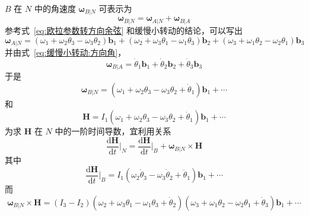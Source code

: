 \begin{example}
    $B$ 在 $N$ 中的角速度 $\bm{\omega}_{B|N}$ 可表示为
    \begin{equation}
        \bm{\omega}_{B|N} = \bm{\omega}_{A|N} + \bm{\omega}_{B|A}
        \label{eq:缓慢小转动:角速度合成}
    \end{equation}
    参考式~\eqref{eq:欧拉参数转方向余弦} 和缓慢小转动的结论，可以写出
    \begin{equation}
        \bm{\omega}_{A|N} = (\omega_1+\omega_2\theta_3-\omega_3\theta_2)\mathbf{b}_1
        + (\omega_2+\omega_3\theta_1-\omega_1\theta_3)\mathbf{b}_2
        + (\omega_3+\omega_1\theta_2-\omega_2\theta_1)\mathbf{b}_3
        \label{eq:缓慢小转动:omegaA_N}
    \end{equation}
    并由式~\eqref{eq:缓慢小转动:方向角}，
    \begin{equation}
        \bm{\omega}_{B|A} = \dot{\theta}_1\mathbf{b}_1+\dot{\theta}_2\mathbf{b}_2+\dot{\theta}_3\mathbf{b}_3
        \label{eq:缓慢小转动:omegaB_A}
    \end{equation}
    于是
    \begin{equation}
        \bm{\omega}_{B|N} = (\omega_1+\omega_2\theta_3-\omega_3\theta_2+\dot{\theta}_1)\mathbf{b}_1+\cdots
        \label{eq:缓慢小转动:omegaB_N}
    \end{equation}
    和
    \begin{equation}
        \mathbf{H} = I_1(\omega_1+\omega_2\theta_3-\omega_3\theta_2+\dot{\theta}_1)\mathbf{b}_1+\cdots
        \label{eq:缓慢小转动:角动量}
    \end{equation}
    为求 $\mathbf{H}$ 在 $N$ 中的一阶时间导数，宜利用关系
    \begin{equation}
        \frac{\mathrm{d}\mathbf{H}}{\mathrm{d}t}\Big|_{N} = \frac{\mathrm{d}\mathbf{H}}{\mathrm{d}t}\Big|_{B} + \bm{\omega}_{B|N}\times\mathbf{H}
        \label{eq:缓慢小转动:H导数}
    \end{equation}
    其中
    \begin{equation}
        \frac{\mathrm{d}\mathbf{H}}{\mathrm{d}t}\Big|_{B} = I_1(\omega_2\dot{\theta}_3-\omega_3\dot{\theta}_2+\ddot{\theta}_1)\mathbf{b}_1+\cdots
        \label{eq:缓慢小转动:B系H导数}
    \end{equation}
    而
    \begin{equation}
        \bm{\omega}_{B|N}\times\mathbf{H} = (I_3-I_2)(\omega_2+\omega_3\theta_1-\omega_1\theta_3+\dot{\theta}_2)(\omega_3+\omega_1\theta_2-\omega_2\theta_1+\dot{\theta}_3)\mathbf{b}_1+\cdots
        \label{eq:缓慢小转动:叉积项}
    \end{equation}

\end{example}

